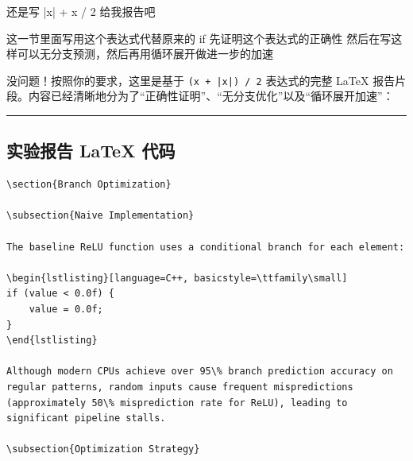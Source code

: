 \documentclass[11pt, a4paper]{article}
\begin{document}
\vspace{1.5em}

\begin{userbox}
还是写 |x| + x / 2 给我报告吧

这一节里面写用这个表达式代替原来的 if   先证明这个表达式的正确性
然后在写这样可以无分支预测，然后再用循环展开做进一步的加速
\end{userbox}

\begin{aibox}
没问题！按照你的要求，这里是基于 \texttt{(x + |x|) / 2} 表达式的完整 LaTeX 报告片段。内容已经清晰地分为了“正确性证明”、“无分支优化”以及“循环展开加速”：

\begin{center}\rule{\textwidth}{0.4pt}\end{center}

\subsection*{实验报告 LaTeX 代码}

\begin{tcolorbox}[colback=white,colframe=gray!50!white,boxrule=0.5pt,arc=2pt,left=5pt,right=5pt,top=5pt,bottom=5pt]
\begin{verbatim}
\section{Branch Optimization}

\subsection{Naive Implementation}

The baseline ReLU function uses a conditional branch for each element:

\begin{lstlisting}[language=C++, basicstyle=\ttfamily\small]
if (value < 0.0f) {
    value = 0.0f;
}
\end{lstlisting}

Although modern CPUs achieve over 95\% branch prediction accuracy on regular patterns, random inputs cause frequent mispredictions (approximately 50\% misprediction rate for ReLU), leading to significant pipeline stalls.

\subsection{Optimization Strategy}


\end{verbatim}
\end{tcolorbox}
\end{aibox}
\end{document}
